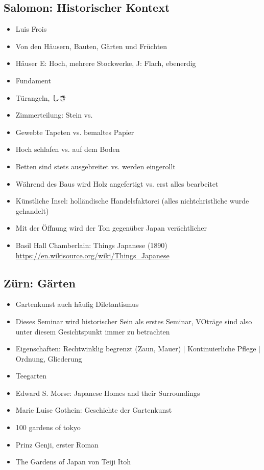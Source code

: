 \documentclass[emulatestandardclasses]{scrartcl}
\begin{document}
\subsection{Salomon: Historischer Kontext}

\begin{itemize}
  \item Luis Frois
  \item Von den Häusern, Bauten, Gärten und Früchten
  \item Häuser E: Hoch, mehrere Stockwerke, J: Flach, ebenerdig
  \item Fundament
  \item Türangeln, しき
  \item Zimmerteilung: Stein vs. 
  \item Gewebte Tapeten vs. bemaltes Papier
  \item Hoch schlafen vs. auf dem Boden
  \item Betten sind stets ausgebreitet vs. werden eingerollt
  \item Während des Baus wird Holz angefertigt vs. erst alles bearbeitet 
  \item Künstliche Insel: holländische Handelsfaktorei (alles nichtchristliche wurde gehandelt)
  \item Mit der Öffnung wird der Ton gegenüber Japan verächtlicher
  \item Basil Hall Chamberlain: Things Japanese (1890) \url{https://en.wikisource.org/wiki/Things_Japanese}
\end{itemize}

\subsection{Zürn: Gärten}

\begin{itemize}
  \item Gartenkunst auch häufig Diletantismus
  \item Dieses Seminar wird historischer Sein als erstes Seminar, VOträge sind also unter diesem Gesichtspunkt immer zu betrachten
  \item Eigenschaften: Rechtwinklig begrenzt (Zaun, Mauer) | Kontinuierliche Pflege | Ordnung, Gliederung
  \item Teegarten
  \item Edward S. Morse: Japanese Homes and their Surroundings
  \item Marie Luise Gothein: Geschichte der Gartenkunst
  \item 100 gardens of tokyo
  \item Prinz Genji, erster Roman
  \item The Gardens of Japan von Teiji Itoh 
\end{itemize}
\end{document}
